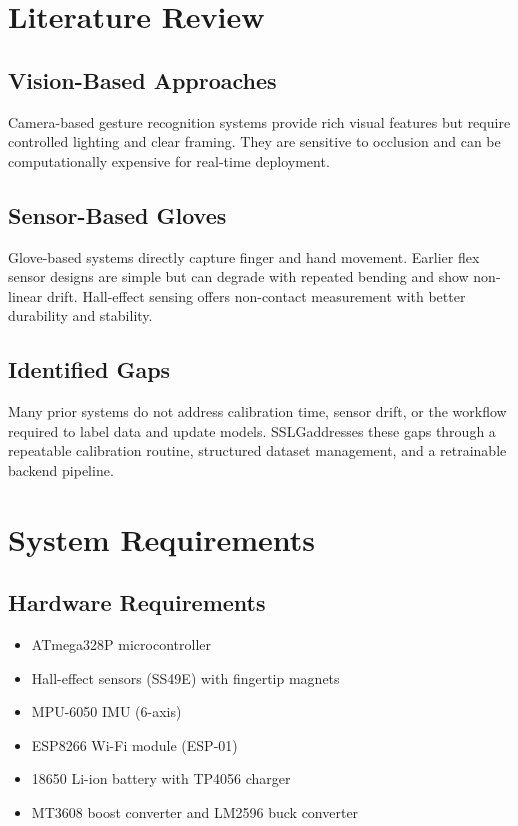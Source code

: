 \documentclass[12pt,a4paper]{report}
\newcommand{\SystemAcronym}{SSLG}
\begin{document}
\chapter{Literature Review}
\section{Vision-Based Approaches}
Camera-based gesture recognition systems provide rich visual features but require
controlled lighting and clear framing. They are sensitive to occlusion and can
be computationally expensive for real-time deployment.

\section{Sensor-Based Gloves}
Glove-based systems directly capture finger and hand movement. Earlier flex
sensor designs are simple but can degrade with repeated bending and show
non-linear drift. Hall-effect sensing offers non-contact measurement with better
durability and stability.

\section{Identified Gaps}
Many prior systems do not address calibration time, sensor drift, or the
workflow required to label data and update models. \SystemAcronym addresses these
gaps through a repeatable calibration routine, structured dataset management,
and a retrainable backend pipeline.

\chapter{System Requirements}
\section{Hardware Requirements}
\begin{itemize}[noitemsep]
  \item ATmega328P microcontroller
  \item Hall-effect sensors (SS49E) with fingertip magnets
  \item MPU-6050 IMU (6-axis)
  \item ESP8266 Wi-Fi module (ESP-01)
  \item 18650 Li-ion battery with TP4056 charger
  \item MT3608 boost converter and LM2596 buck converter
\end{itemize}
\end{document}
